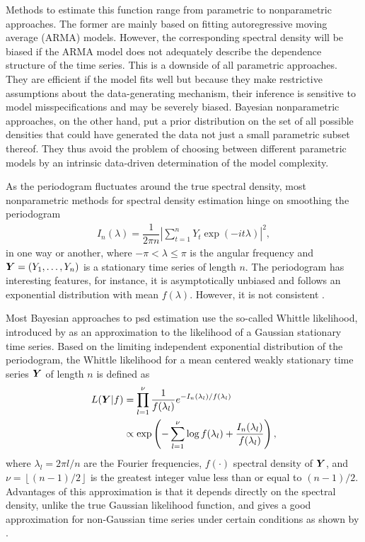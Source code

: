 \documentclass[twocolumn,final]{svjour3}
\newcommand{\bm}[1]{\mbox{\boldmath $#1$}}
\begin{document}
Methods to estimate this function range from parametric to nonparametric approaches.  The former are mainly based on fitting  autoregressive moving average (ARMA) models. However, the corresponding spectral density will be biased if the ARMA model does not adequately describe the dependence structure of the time series. This is a downside of all parametric approaches.
They are efficient if the model fits well but because they make restrictive assumptions about the data-generating mechanism, their inference is sensitive to model misspecifications and may  be severely biased. 
Bayesian nonparametric approaches, on the other hand, put a prior distribution on the set of all possible densities that could have generated the data not just a small parametric subset thereof. They thus avoid the problem of choosing between different parametric models  by an intrinsic data-driven determination of the model complexity.

As the periodogram fluctuates around the true spectral density, most  nonparametric methods for spectral density estimation hinge on  smoothing the periodogram
\begin{align*}
I_n(\lambda) = \dfrac{1}{2 \pi n} \left| \sum_{t=1}^{n} Y_t \exp \left( -i t \lambda\right)\right|^2,
\end{align*}
in one way or another, where $-\pi < \lambda \leq \pi$ is the angular frequency and $\bm{Y}=(Y_1,\ldots,Y_n)$ is a stationary time series of length $n$. The periodogram has interesting features, for instance, it is asymptotically unbiased and follows an exponential distribution with mean $f(\lambda)$.  However, it is not consistent \citep{Brockwell:1986}.


Most Bayesian approaches to psd estimation use the so-called Whittle likelihood, introduced by \citep{Whittle:1957} as an approximation to the likelihood of a Gaussian stationary time series.  Based on the  limiting independent exponential distribution of the periodogram, the Whittle likelihood for a mean centered weakly stationary time series $\bm{Y}$ of length $n$ is defined as
\begin{align}
L(\bm{Y} | f) &= \prod_{l=1}^{\nu}\dfrac{1}{f(\lambda_{l})} e^{-I_n(\lambda_l)/f(\lambda_l)}  \nonumber \\
&\propto \exp \left( - \sum_{l=1}^{\nu} \log f(\lambda_l) + \dfrac{I_{n}(\lambda_l)}{f(\lambda_l)} \right),\label{eq:whittle_like}
\end{align}
where $\lambda_l = 2\pi l / n$ are the Fourier frequencies, $f(\cdot)$ spectral density of $\bm{Y}$, and $\nu = \left\lfloor (n-1)/2 \right\rfloor$ is the greatest integer value less than or equal to $(n-1)/2$. Advantages of this approximation is that it depends directly on the spectral density, unlike the true Gaussian likelihood function, and gives a good approximation for non-Gaussian time series under certain conditions as shown by \cite{ShaoXiaofeng2007ASTf}.
\end{document}
